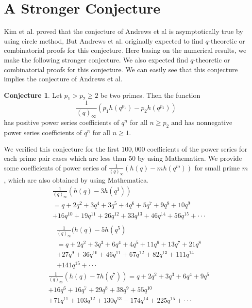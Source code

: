 \documentclass[11pt,reqno]{amsart}
\theoremstyle{definition}
\newtheorem{conjecture}[theorem]{Conjecture}
\numberwithin{equation}{section}
\begin{document}
\section{A Stronger Conjecture }
Kim et al. proved that the conjecture of Andrews et al is asymptotically true by using circle method, But Andrews et al. originally expected to find $q$-theoretic or combinatorial proofs for this conjecture.  Here basing on the numerical results, we make the following stronger conjecture. We also expected find $q$-theoretic or combinatorial proofs for this conjecture. We can easily see that this conjecture implies the conjecture of Andrews et al.
\begin{conjecture}
Let $p_{1}>p_{2} \geq2$ be two primes.  Then the function
$$
 \frac{1}{(q)_{\infty}} ( p_{1}h(q^{p_{1}}) - p_{2}h(q^{p_{2}}) )$$
has positive power series coefficients of $q^{n}$ for all $n\geq p_{2}$ and has nonnegative power series coefficients of $q^{n}$ for all $n\geq 1$.
\end{conjecture}
We verified this conjecture for the first $100,000$ coefficients of the power series for each prime pair cases which are less than $50$ by using Mathematica. We provide some coefficients of power series of  $\frac{1}{(q)_{\infty}} ( h(q) - m h(q^m) )$ for small prime $m$, which are also obtained by using Mathematica.
\begin{equation*}
\begin{aligned}
 &\frac{1}{(q)_{\infty}} ( h(q) - 3 h(q^3) )\\
 &=q + 2 q^2 + 3 q^4 + 3 q^5 + 4 q^6 + 5 q^7 + 9 q^8 + 10 q^9 \\
 &+16 q^{10} + 19 q^{11} + 26 q^{12} + 33 q^{13} + 46 q^{14} + 56 q^{15} +\cdot\cdot\cdot \\
 \end{aligned}
 \end{equation*} 
  \begin{equation*}
\begin{aligned} & \frac{1}{(q)_{\infty}} ( h(q) - 5 h(q^5) \\
& =q + 2 q^2 + 3 q^3 + 6 q^4 + 4 q^5 + 11 q^6 + 13 q^7 + 21 q^8 \\
&+27 q^9 + 36 q^{10} + 46 q^{11} + 67 q^{12} + 82 q^{13} + 111 q^{14} \\
&+ 141 q^{15} +\cdot\cdot\cdot
 \end{aligned}
 \end{equation*} 
  \begin{equation*}
\begin{aligned} & \frac{1}{(q)_{\infty}} ( h(q) - 7 h(q^7) )=q + 2 q^2 + 3 q^3 + 6 q^4 + 9 q^5 \\
&+ 16 q^6 + 16 q^7 + 29 q^8 + 
 38 q^9 + 55 q^{10} \\
 &+ 71 q^{11} + 103 q^{12 }+ 130 q^{13} + 174 q^{14 }+ 
 225 q^{15} +\cdot\cdot\cdot\\
  \end{aligned}
 \end{equation*}  
 
\end{document}
